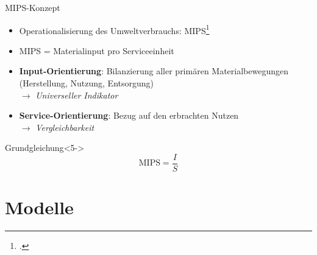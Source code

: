 \documentclass[beamer, xcolor={table,usenames,dvipsnames}]{beamer}
\begin{document}
	\begin{frame}{MIPS-Konzept}
		\begin{itemize}
			\item<1-> Operationalisierung des Umweltverbrauchs:
                MIPS\footcite{liedtke_resource_2014}
			\item<2-> MIPS = Materialinput pro Serviceeinheit
			\item<3-> \textbf{Input-Orientierung}: Bilanzierung aller primären Materialbewegungen (Herstellung, Nutzung, Entsorgung) \\
			$\rightarrow$ \emph{Universeller Indikator}
			\item<4-> \textbf{Service-Orientierung}: Bezug auf den erbrachten Nutzen \\
			$\rightarrow$ \emph{Vergleichbarkeit}
		\end{itemize}
		\begin{block}{Grundgleichung}<5->
			$$\text{MIPS} = \frac{I}{S}$$
		\end{block}
	\end{frame}

\section{Modelle}
\end{document}
